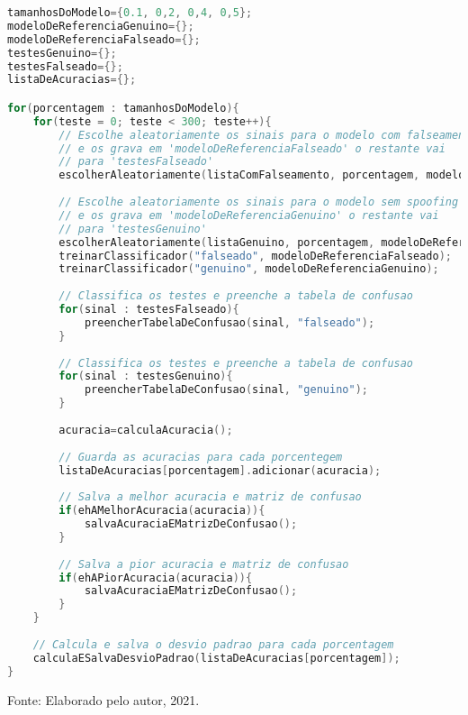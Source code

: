 \begin{lstlisting}[language=C++, caption={Algoritmo que caracteriza o procedimento 03}, captionpos=t, label={lst:experiment03Algo}, belowskip=-0.8 \baselineskip]
tamanhosDoModelo={0.1, 0,2, 0,4, 0,5};
modeloDeReferenciaGenuino={};
modeloDeReferenciaFalseado={};
testesGenuino={};
testesFalseado={};
listaDeAcuracias={};

for(porcentagem : tamanhosDoModelo){
	for(teste = 0; teste < 300; teste++){
		// Escolhe aleatoriamente os sinais para o modelo com falseamento 
		// e os grava em 'modeloDeReferenciaFalseado' o restante vai 
		// para 'testesFalseado'
		escolherAleatoriamente(listaComFalseamento, porcentagem, modeloDeReferenciaFalseado, testesFalseado);
		
		// Escolhe aleatoriamente os sinais para o modelo sem spoofing
		// e os grava em 'modeloDeReferenciaGenuino' o restante vai 
		// para 'testesGenuino'
		escolherAleatoriamente(listaGenuino, porcentagem, modeloDeReferenciaGenuino, testesGenuino);
		treinarClassificador("falseado", modeloDeReferenciaFalseado);
		treinarClassificador("genuino", modeloDeReferenciaGenuino);
		
		// Classifica os testes e preenche a tabela de confusao
		for(sinal : testesFalseado){
			preencherTabelaDeConfusao(sinal, "falseado");
		} 
		
		// Classifica os testes e preenche a tabela de confusao
		for(sinal : testesGenuino){
			preencherTabelaDeConfusao(sinal, "genuino");
		}
		
		acuracia=calculaAcuracia();
		
		// Guarda as acuracias para cada porcentegem
		listaDeAcuracias[porcentagem].adicionar(acuracia);
		
		// Salva a melhor acuracia e matriz de confusao
		if(ehAMelhorAcuracia(acuracia)){
			salvaAcuraciaEMatrizDeConfusao();
		}
		
		// Salva a pior acuracia e matriz de confusao
		if(ehAPiorAcuracia(acuracia)){
			salvaAcuraciaEMatrizDeConfusao();
		}
	}
	
	// Calcula e salva o desvio padrao para cada porcentagem
	calculaESalvaDesvioPadrao(listaDeAcuracias[porcentagem]);
}
\end{lstlisting}
\begin{center}
	\par Fonte: Elaborado pelo autor, 2021.
\end{center}